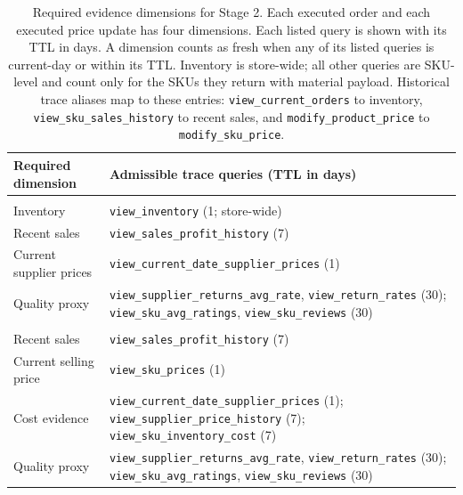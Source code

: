 \begin{table}[t]
\centering
\small
\setlength{\tabcolsep}{5pt}
\renewcommand{\arraystretch}{1.08}
\begin{tabular}{@{}>{\raggedright\arraybackslash}p{}>{\raggedright\arraybackslash}p{}@{}}
\toprule
Required dimension & Admissible trace queries (TTL in days) \\
\midrule
\multicolumn{2}{@{}l}{\textbf{Executed order (\texttt{place\_order})}} \\
Inventory & \texttt{view\_inventory} (1; store-wide) \\
Recent sales & \texttt{view\_sales\_profit\_history} (7) \\
Current supplier prices & \texttt{view\_current\_date\_supplier\_prices} (1) \\
Quality proxy & \texttt{view\_supplier\_returns\_avg\_rate}, \texttt{view\_return\_rates} (30); \texttt{view\_sku\_avg\_ratings}, \texttt{view\_sku\_reviews} (30) \\
\midrule
\multicolumn{2}{@{}l}{\textbf{Executed price update (\texttt{modify\_sku\_price})}} \\
Recent sales & \texttt{view\_sales\_profit\_history} (7) \\
Current selling price & \texttt{view\_sku\_prices} (1) \\
Cost evidence & \texttt{view\_current\_date\_supplier\_prices} (1); \texttt{view\_supplier\_price\_history} (7); \texttt{view\_sku\_inventory\_cost} (7) \\
Quality proxy & \texttt{view\_supplier\_returns\_avg\_rate}, \texttt{view\_return\_rates} (30); \texttt{view\_sku\_avg\_ratings}, \texttt{view\_sku\_reviews} (30) \\
\bottomrule
\end{tabular}
\caption{Required evidence dimensions for Stage 2. Each executed order and each executed price update has four dimensions. Each listed query is shown with its TTL in days. A dimension counts as fresh when any of its listed queries is current-day or within its TTL. Inventory is store-wide; all other queries are SKU-level and count only for the SKUs they return with material payload. Historical trace aliases map to these entries: \texttt{view\_current\_orders} to inventory, \texttt{view\_sku\_sales\_history} to recent sales, and \texttt{modify\_product\_price} to \texttt{modify\_sku\_price}.}
\label{tab:required_evidence}
\end{table}

